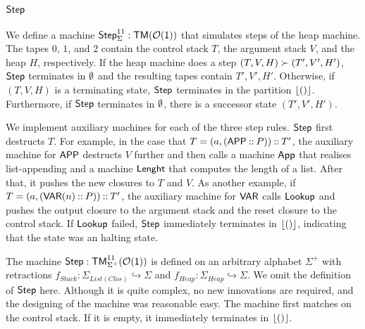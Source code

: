 \subsection{$\mathsf{Step}$}
\label{sec:heap-Step}
%


We define a machine $\mathsf{Step}_\Sigma^{11} : \mathsf{TM}(\mathcal{O}(\mathsf{1}))$ that simulates steps of the heap machine.  The tapes $0$, $1$, and $2$ contain the
control stack $T$, the argument stack $V$, and the heap $H$, respectively.  If the heap machine does a step $(T,V,H) \succ (T',V',H')$, $\mathsf{Step}$
terminates in $\emptyset$ and the resulting tapes contain $T',V',H'$.  Otherwise, if $(T,V,H)$ is a terminating state, $\mathsf{Step}$ terminates in the
partition $\left\lfloor {\ensuremath{\mathsf{()}}} \right\rfloor$.  Furthermore, if $\mathsf{Step}$ terminates in $\emptyset$, there is a successor state $(T',V',H')$.

We implement auxiliary machines for each of the three step rules.  $\mathsf{Step}$ first destructs $T$.  For example, in the case that
$T=(a, (\mathsf{APP} \mathbin{::} P)) \mathbin{::} T'$, the auxiliary machine for $\mathsf{APP}$ destructs $V$ further and then calls a machine $\mathsf{App}$ that realises
list-appending and a machine $\mathsf{Lenght}$ that computes the length of a list.  After that, it pushes the new closures to $T$ and $V$.  As another
example, if $T=(a, (\mathsf{VAR}(n) \mathbin{::} P)) \mathbin{::} T'$, the auxiliary machine for $\mathsf{VAR}$ calls $\mathsf{Lookup}$ and pushes the output closure to the
argument stack and the reset closure to the control stack.  If $\mathsf{Lookup}$ failed, $\mathsf{Step}$ immediately terminates in $\left\lfloor {\ensuremath{\mathsf{()}}} \right\rfloor$, indicating
that the state was an halting state.

The machine $\mathsf{Step} : \mathsf{TM}_{\Sigma^+}^{11}(\mathcal{O}(\mathsf{1}))$ is defined on an arbitrary alphabet $\Sigma^+$ with retractions
$f_{Stack} : \Sigma_{List(Clos)} \hookrightarrow \Sigma$ and $f_{Heap} : \Sigma_{Heap} \hookrightarrow \Sigma$.  We omit the definition of $\mathsf{Step}$
here.  Although it is quite complex, no new innovations are required, and the designing of the machine was reasonable easy.  The machine first matches
on the control stack.  If it is empty, it immediately terminates in $\left\lfloor {\ensuremath{\mathsf{()}}} \right\rfloor$.

